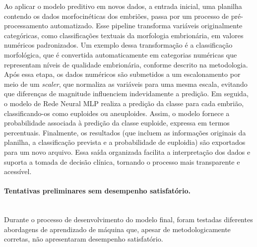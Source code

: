 Ao aplicar o modelo preditivo em novos dados, a entrada inicial, uma planilha contendo os dados morfocinéticas dos embriões, passa por um processo de pré-processamento automatizado. Esse pipeline transforma variáveis originalmente categóricas, como classificações textuais da morfologia embrionária, em valores numéricos padronizados. Um exemplo dessa transformação é a classificação morfológica, que é convertida automaticamente em categorias numéricas que representam níveis de qualidade embrionária, conforme descrito na metodologia. Após essa etapa, os dados numéricos são submetidos a um escalonamento por meio de um \textit{scaler}, que normaliza as variáveis para uma mesma escala, evitando que diferenças de magnitude influenciem indevidamente a predição. Em seguida, o modelo de Rede Neural MLP realiza a predição da classe para cada embrião, classificando-os como euploides ou aneuploides. Assim, o modelo fornece a probabilidade associada à predição da classe euploide, expressa em termos percentuais. Finalmente, os resultados (que incluem as informações originais da planilha, a classificação prevista e a probabilidade de euploidia) são exportados para um novo arquivo. Essa saída organizada facilita a interpretação dos dados e suporta a tomada de decisão clínica, tornando o processo mais transparente e acessível.

\paragraph{Tentativas preliminares sem desempenho satisfatório.} \mbox{}\\
Durante o processo de desenvolvimento do modelo final, foram testadas diferentes abordagens de aprendizado de máquina que, apesar de metodologicamente corretas, não apresentaram desempenho satisfatório.

